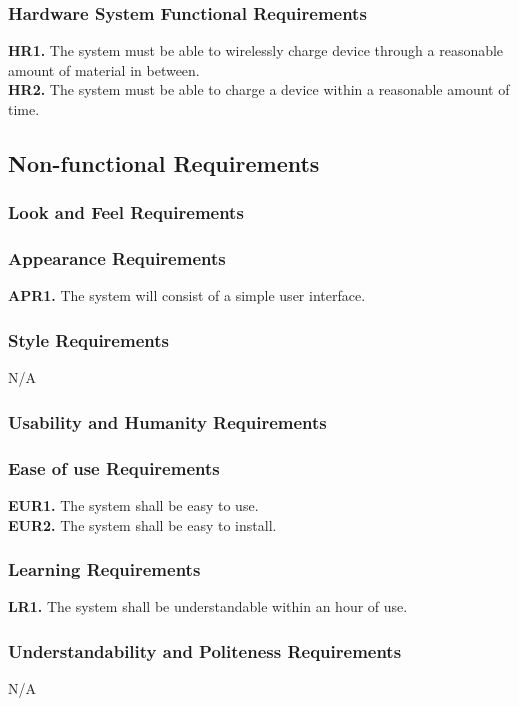 \documentclass[12pt, titlepage]{article}
\begin{document}
\subsubsection{Hardware System Functional Requirements}
\textbf{HR1.} The system must be able to wirelessly charge device through a reasonable amount of material in between.\\
\textbf{HR2.} The system must be able to charge a device within a reasonable amount of time.\\

\subsection{Non-functional Requirements}
\subsubsection{Look and Feel Requirements}
\subsubsection{Appearance Requirements}
\textbf{APR1.} The system will consist of a simple user interface.

\subsubsection{Style Requirements}
N/A
\subsubsection{Usability and Humanity Requirements}
\subsubsection{Ease of use Requirements}
\textbf{EUR1.} The system shall be easy to use.\\
\textbf{EUR2.} The system shall be easy to install.

\subsubsection{Learning Requirements}
\textbf{LR1.} The system shall be understandable within an hour of use.

\subsubsection{Understandability and Politeness Requirements}
N/A
\end{document}
